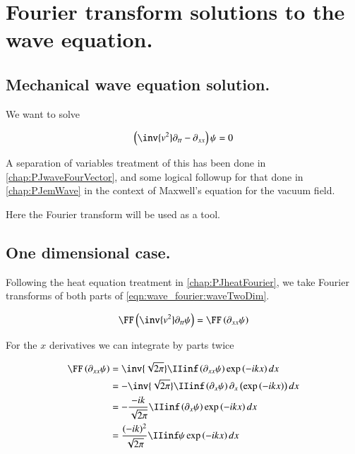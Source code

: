 \chapter{Fourier transform solutions to the wave equation.}\label{chap:PJwaveFourier}
\date{ Jan 26, 2009.  $RCSfile: waveFourier.tex,v $ Last $Revision: 1.11 $ $Date: 2009/06/11 16:41:12 $ }

\section{Mechanical wave equation solution. }

We want to solve

\begin{align}\label{eqn:wave_fourier:waveTwoDim}
\left(\inv{v^2} \partial_{tt} - \partial_{xx}\right) \psi = 0
\end{align}

A separation of variables treatment of this has been done in
\ref{chap:PJwaveFourVector}, and some logical followup for that done in
\ref{chap:PJemWave} in the context of Maxwell's equation for the vacuum field.

Here the Fourier transform will be used as a tool.

\section{One dimensional case. }

Following the heat equation treatment in \ref{chap:PJheatFourier}, we take Fourier transforms 
of both parts of \ref{eqn:wave_fourier:waveTwoDim}.

\begin{align*}
\FF\left( \inv{v^2} \partial_{tt} \psi \right) = \FF\left( \partial_{xx} \psi \right)
\end{align*}

For the $x$ derivatives we can integrate by parts twice

\begin{align*}
\FF\left( \partial_{xx} \psi \right)
&= \inv{\sqrt{2 \pi}} \IIinf \left( \partial_{xx} \psi \right) \exp\left( -i k x \right) dx \\
&= -\inv{\sqrt{2 \pi}} \IIinf \left( \partial_{x} \psi \right) \partial_x\left(\exp\left( -i k x \right) \right) dx \\
&= -\frac{-i k}{\sqrt{2 \pi}} \IIinf \left( \partial_{x} \psi \right) \exp\left( -i k x \right) dx \\
&= \frac{(-i k)^2}{\sqrt{2 \pi}} \IIinf \psi \exp\left( -i k x \right) dx \\
\end{align*}


